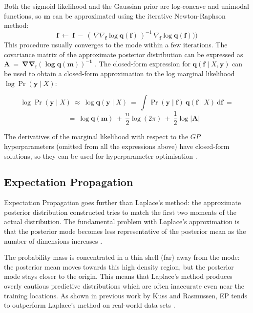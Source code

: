 \documentclass[a4paper,12pt ]{report}
\renewcommand{\GP}{{GP}}
\begin{document}
Both the sigmoid likelihood and the Gaussian prior are log-concave and unimodal functions, so $\mathbf{m}$ can be approximated using the iterative Newton-Raphson method:
\begin{equation*} \mathbf{f} ~\gets~ \mathbf{f} ~-~ (~ \nabla \nabla_{\mathbf{f}} \log \mathbf{q}(\mathbf{f})~)^{-1} ~ \nabla_{\mathbf{f}} \log \mathbf{q}(\mathbf{f}))  )  \end{equation*}
This procedure usually converges to the mode within a few iterations. The covariance matrix of the approximate posterior distribution can be expressed as $ \mathbf{A} ~=~ \mathbf{\nabla \nabla_{\mathbf{f}} (\log \mathbf{q}(\mathbf{m}))^{-1}}$ \cite{gpcinference}. The closed-form expression for $ \mathbf{q}(\mathbf{f} \mid X, \mathbf{y} )$ can be used to obtain a closed-form approximation to the log marginal likelihood $\log \Pr(\mathbf{y} \mid X)$:

\begin{equation*} \log \Pr(\mathbf{y} \mid X) ~\approx~ \log \mathbf{q}(\mathbf{y}\mid X) ~=~ \int{ \Pr(\mathbf{y} \mid \mathbf{f}) ~ \mathbf{q}(\mathbf{f} \mid X) ~ \mathrm{d}\mathbf{f} } ~ = \end{equation*}
\begin{equation*}  ~~~~~~~~~ = ~ \log \mathbf{q}(\mathbf{m}) ~+~ \frac{n}{2}\log(2\pi) ~+~ \frac{1}{2}\log |\mathbf{A}|  \end{equation*}

The derivatives of the marginal likelihood with respect to the $\GP$ hyperparameters (omitted from all the expressions above) have closed-form solutions, so they can be used for hyperparameter optimisation \cite{gpcapprox}.

\subsection{Expectation Propagation}

Expectation Propagation \cite{minka} goes further than Laplace's method: the approximate posterior distribution constructed tries to match the first two moments of the actual distribution. The fundamental problem with Laplace's approximation is that the posterior mode becomes less representative of the posterior mean as the number of dimensions increases \cite{gpcapprox, gpcinference}.

The probability mass is concentrated in a thin shell (far) away from the mode: the posterior mean moves towards this high density region, but the posterior mode stays closer to the origin. This means that Laplace's method produces overly cautious predictive distributions which are often inaccurate even near the training locations. As shown in previous work by Kuss and Rasmussen, EP tends to outperform Laplace's method on real-world data sets \cite{gpcapprox, gpcinference}.
\end{document}
